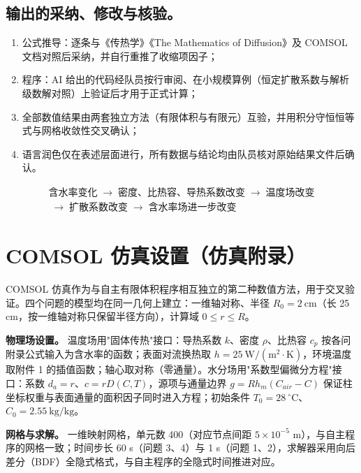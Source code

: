 \documentclass[12pt,a4paper]{article}
\renewcommand{\boxed}[1]{#1}
\begin{document}
\subsection*{输出的采纳、修改与核验。} 
\begin{enumerate}
       \item 公式推导：逐条与《传热学》《The Mathematics of Diffusion》及 COMSOL 文档对照后采纳，并自行重推了收缩项因子；
       \item 程序：AI 给出的代码经队员按行审阅、在小规模算例（恒定扩散系数与解析级数解对照）上验证后才用于正式计算；
       \item 全部数值结果由两套独立方法（有限体积与有限元）互验，并用积分守恒恒等式与网格收敛性交叉确认；
       \item 语言润色仅在表述层面进行，所有数据与结论均由队员核对原始结果文件后确认。
\end{enumerate}
\begin{equation}
\boxed{
\begin{gathered}
\text{含水率变化} \;\longrightarrow\; \text{密度、比热容、导热系数改变} \;\longrightarrow\; \text{温度场改变}\\
\;\longrightarrow\; \text{扩散系数改变} \;\longrightarrow\; \text{含水率场进一步改变}
\end{gathered}
}
\end{equation}

\section{COMSOL 仿真设置（仿真附录）}

COMSOL 仿真作为与自主有限体积程序相互独立的第二种数值方法，用于交叉验证。四个问题的模型均在同一几何上建立：一维轴对称、半径 $R_0=2\ \mathrm{cm}$（长 25 cm，按一维轴对称只保留半径方向），计算域 $0\le r\le R$。

\textbf{物理场设置。} 温度场用"固体传热"接口：导热系数 $k$、密度 $\rho$、比热容 $c_p$ 按各问附录公式输入为含水率的函数；表面对流换热取 $h=25\ \mathrm{W/(m^2\cdot K)}$，环境温度取附件 1 的插值函数；轴心取对称（零通量）。水分场用"系数型偏微分方程"接口：系数 $d_a=r$、$c=rD(C,T)$，源项与通量边界 $g=Rh_m(C_{air}-C)$ 保证柱坐标权重与表面通量的面积因子同时进入方程；初始条件 $T_0=28\ \mathrm{^\circ C}$、$C_0=2.55\ \mathrm{kg/kg}$。

\textbf{网格与求解。} 一维映射网格，单元数 400（对应节点间距 $5\times10^{-5}$ m），与自主程序的网格一致；时间步长 60 s（问题 3、4）与 1 s（问题 1、2），求解器采用向后差分（BDF）全隐式格式，与自主程序的全隐式时间推进对应。
\end{document}

